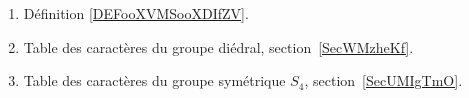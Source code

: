 
\begin{enumerate}
	\item Définition \ref{DEFooXVMSooXDIfZV}.
	\item Table des caractères du groupe diédral, section~\ref{SecWMzheKf}.
	\item Table des caractères du groupe symétrique \( S_4\), section~\ref{SecUMIgTmO}.
\end{enumerate}
